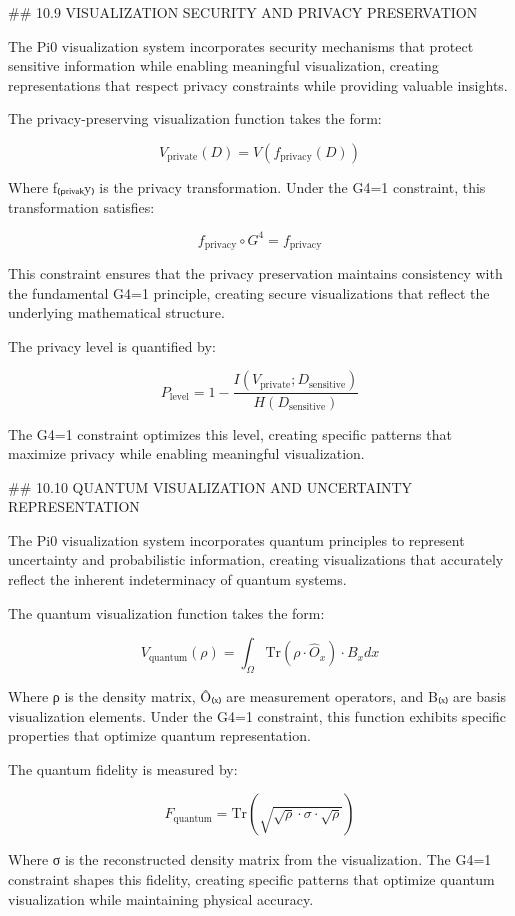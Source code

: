 ## 10.9 VISUALIZATION SECURITY AND PRIVACY PRESERVATION

The Pi0 visualization system incorporates security mechanisms that protect sensitive information while enabling meaningful visualization, creating representations that respect privacy constraints while providing valuable insights.

The privacy-preserving visualization function takes the form:

$$V_{\text{private}}(D) = V(f_{\text{privacy}}(D))$$

Where f₍ₚᵣᵢᵥₐₖy₎ is the privacy transformation. Under the G4=1 constraint, this transformation satisfies:

$$f_{\text{privacy}} \circ G^4 = f_{\text{privacy}}$$

This constraint ensures that the privacy preservation maintains consistency with the fundamental G4=1 principle, creating secure visualizations that reflect the underlying mathematical structure.

The privacy level is quantified by:

$$P_{\text{level}} = 1 - \frac{I(V_{\text{private}}; D_{\text{sensitive}})}{H(D_{\text{sensitive}})}$$

The G4=1 constraint optimizes this level, creating specific patterns that maximize privacy while enabling meaningful visualization.

## 10.10 QUANTUM VISUALIZATION AND UNCERTAINTY REPRESENTATION

The Pi0 visualization system incorporates quantum principles to represent uncertainty and probabilistic information, creating visualizations that accurately reflect the inherent indeterminacy of quantum systems.

The quantum visualization function takes the form:

$$V_{\text{quantum}}(\rho) = \int_{\Omega} \text{Tr}(\rho \cdot \hat{O}_x) \cdot B_x dx$$

Where ρ is the density matrix, Ô₍ₓ₎ are measurement operators, and B₍ₓ₎ are basis visualization elements. Under the G4=1 constraint, this function exhibits specific properties that optimize quantum representation.

The quantum fidelity is measured by:

$$F_{\text{quantum}} = \text{Tr}(\sqrt{\sqrt{\rho} \cdot \sigma \cdot \sqrt{\rho}})$$

Where σ is the reconstructed density matrix from the visualization. The G4=1 constraint shapes this fidelity, creating specific patterns that optimize quantum visualization while maintaining physical accuracy.

